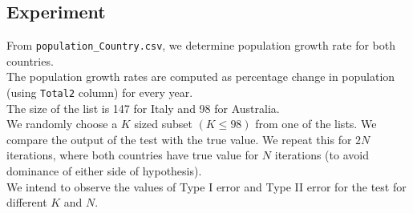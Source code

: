 \documentclass[fleqn, 11pt]{article}
\begin{document}
\subsection{Experiment}
From \verb!population_Country.csv!, we determine population growth rate for both countries. \\
The population growth rates are computed as percentage change in population (using \verb!Total2! column) for every year. \\
The size of the list is 147 for Italy and 98 for Australia. \\
We randomly choose a $K$ sized subset $(K \le 98)$ from one of the lists. We compare the output of the test with the true value. We repeat this for $2N$ iterations, where both countries have true value for $N$ iterations (to avoid dominance of either side of hypothesis). \\
We intend to observe the values of Type I error and Type II error for the test for different $K$ and $N$.
\end{document}
